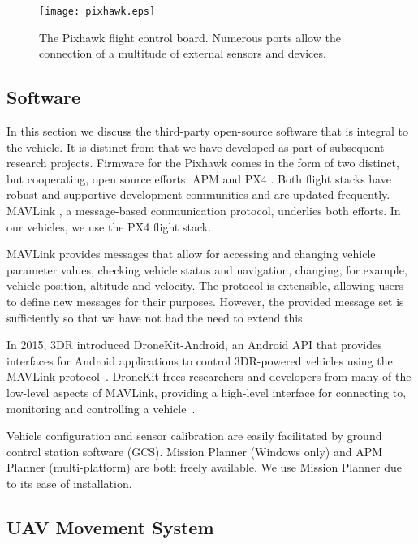 \documentclass[12pt]{article}
\begin{document}
    \begin{figure}[H]
	\centering
	\texttt{[image: pixhawk.eps]}
	\caption{The Pixhawk flight control board. Numerous ports allow the connection of a multitude of external sensors and devices.\label{fig:pixhawk}}
	\end{figure}

\subsection{Software}
\label{subsec:software}
In this section we discuss the third-party open-source software that is integral to the vehicle. It is distinct from that we have developed as part of subsequent research projects. Firmware for the Pixhawk comes in the form of two distinct, but cooperating, open source efforts: APM \cite{ardupilotdev} and PX4 \cite{meieretalPX42015}. Both flight stacks have robust and supportive development communities and are updated frequently. MAVLink \cite{mavilink}, a message-based communication protocol, underlies both efforts. In our vehicles, we use the PX4 flight stack.

MAVLink provides messages that allow for accessing and changing vehicle parameter values, checking vehicle status and navigation, changing, for example, vehicle position, altitude and velocity. The protocol is extensible, allowing users to define new messages for their purposes. However, the provided message set is sufficiently so that we have not had the need to extend this.

In 2015, 3DR introduced DroneKit-Android, an Android API that provides interfaces for Android applications to control 3DR-powered vehicles using the MAVLink protocol~\cite{mavilink}. DroneKit frees researchers and developers from many of the low-level aspects of MAVLink, providing a high-level interface for connecting to, monitoring and controlling a vehicle~\cite{dronekit}.

Vehicle configuration and sensor calibration are easily facilitated by ground control station software (GCS). Mission Planner (Windows only) and APM Planner (multi-platform) are both freely available. We use Mission Planner due to its ease of installation.

\subsection{UAV Movement System}
\label{sec:uav}
\end{document}
